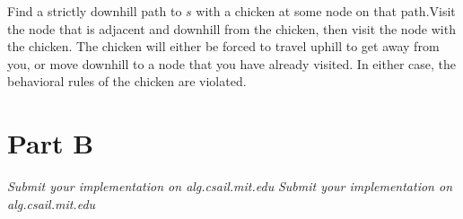 \documentclass[12pt,twoside]{article}
\begin{document}
\begin{problems}
\begin{problemparts}
\problempart Find a strictly downhill path to $s$ with a chicken at some node on that path.Visit the node that is adjacent and downhill from the chicken, then visit the node with the chicken. The chicken will either be forced to travel uphill to get away from you, or move downhill to a node that you have already visited. In either case, the behavioral rules of the chicken are violated.
\end{problemparts}

\section*{Part B}

\problem
\begin{problemparts}
\problempart \emph{Submit your implementation on alg.csail.mit.edu}
\problempart \emph{Submit your implementation on alg.csail.mit.edu}



\end{problemparts}
\end{problems}
\end{document}
